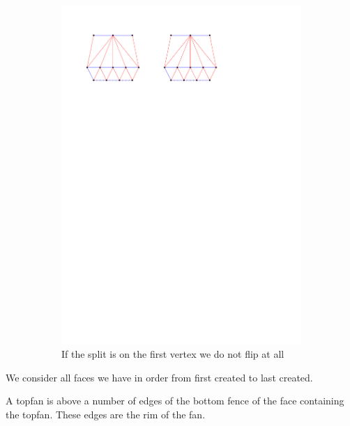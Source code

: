 \begin{figure}
\begin{subfigure}[b]{0.45 \textwidth}
    \end{subfigure}
    ~
    \begin{subfigure}[b]{0.45 \textwidth}
        \includegraphics[width =\textwidth]{topFanFlips/img/splitfront}
        \caption{If the split is on the first vertex we do not flip at all}
        \label{fig:fanflip:splitFirstVertex}

    \end{subfigure}

    \caption{}
    \label{fig:fanflip:fanflips}
\end{figure}



We consider all faces we have in order from first created to last created.

A topfan is above a number of edges of the bottom fence of the face containing the topfan. These edges are the rim of the fan.

